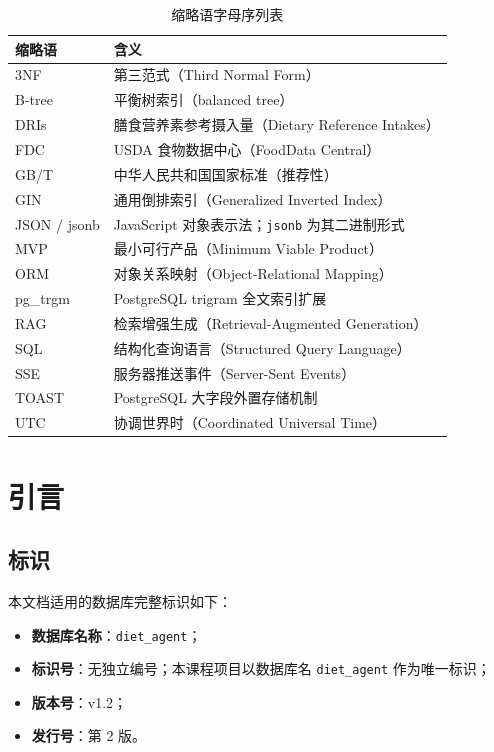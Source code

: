 \documentclass[12pt,a4paper]{ctexart}
\begin{document}
\begin{xltabular}{\linewidth}{Q{3cm}L}
\caption{缩略语字母序列表} \\
\toprule
\textbf{缩略语} & \textbf{含义} \\
\midrule
\endhead
3NF & 第三范式（Third Normal Form） \\
B-tree & 平衡树索引（balanced tree） \\
DRIs & 膳食营养素参考摄入量（Dietary Reference Intakes） \\
FDC & USDA 食物数据中心（FoodData Central） \\
GB/T & 中华人民共和国国家标准（推荐性） \\
GIN & 通用倒排索引（Generalized Inverted Index） \\
JSON / jsonb & JavaScript 对象表示法；\texttt{jsonb} 为其二进制形式 \\
MVP & 最小可行产品（Minimum Viable Product） \\
ORM & 对象关系映射（Object-Relational Mapping） \\
pg\_trgm & PostgreSQL trigram 全文索引扩展 \\
RAG & 检索增强生成（Retrieval-Augmented Generation） \\
SQL & 结构化查询语言（Structured Query Language） \\
SSE & 服务器推送事件（Server-Sent Events） \\
TOAST & PostgreSQL 大字段外置存储机制 \\
UTC & 协调世界时（Coordinated Universal Time） \\
\bottomrule
\end{xltabular}

\section{引言}

\subsection{标识}

本文档适用的数据库完整标识如下：

\begin{itemize}
\item \textbf{数据库名称}：\texttt{diet\_agent}；
\item \textbf{标识号}：无独立编号；本课程项目以数据库名 \texttt{diet\_agent} 作为唯一标识；
\item \textbf{版本号}：v1.2；
\item \textbf{发行号}：第 2 版。
\end{itemize}
\end{document}
